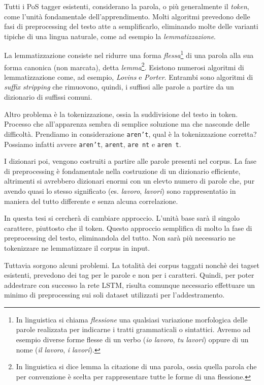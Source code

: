 Tutti i PoS tagger esistenti, considerano la parola, o pi\`u generalmente il \emph{token}, come l'unit\`a fondamentale dell'apprendimento.
Molti algoritmi prevedono delle fasi di preprocessing del testo atte a semplificarlo, eliminando molte delle varianti tipiche di una lingua naturale, come ad esempio la \emph{lemmatizzazione}.

La lemmatizzazione consiste nel ridurre una forma \emph{flessa}\footnote{In linguistica si chiama \emph{flessione} una qualsiasi variazione morfologica delle parole realizzata per indicarne i tratti grammaticali o sintattici. Avremo ad esempio diverse forme flesse di un verbo (\emph{io lavoro}, \emph{tu lavori}) oppure di un nome (\emph{il lavoro}, \emph{i lavori}).} di una parola alla sua forma canonica (non marcata), detta \emph{lemma}\footnote{In linguistica si dice lemma la citazione di una parola, ossia quella parola che per convenzione è scelta per rappresentare tutte le forme di una flessione.}.
Esistono numerosi algoritmi di lemmatizzazione come, ad esempio, \emph{Lovins} e \emph{Porter}.
Entrambi sono algoritmi di \emph{suffix stripping} che rimuovono, quindi, i suffissi alle parole a partire da un dizionario di suffissi comuni.

Altro problema \`e la tokenizzazione, ossia la suddivisione del testo in token. Processo che all'apparenza sembra di semplice soluzione ma che nasconde delle difficolt\`a.
Prendiamo in considerazione \texttt{aren't}, qual \`e la tokenizzazione corretta? Possiamo infatti avvere \texttt{aren't}, \texttt{arent}, \texttt{are nt} e \texttt{aren t}.

I dizionari poi, vengono costruiti a partire alle parole presenti nel corpus.
La fase di preprocessing \`e fondamentale nella costruzione di un dizionario efficiente, altrimenti si avrebbero dizionari enormi con un elevto numero di parole che, pur avendo quasi lo stesso significato (es. \emph{lavoro}, \emph{lavori}) sono rappresentatio in maniera del tutto differente e senza alcuna correlazione.

In questa tesi si cercher\`a di cambiare approccio. L'unit\`a base sar\`a il singolo carattere, piuttosto che il token.
Questo approccio semplifica di molto la fase di preprocessing del testo, eliminandola del tutto.
Non sar\`a pi\`u necessario ne tokenizzare ne lemmatizzare il corpus in input.

Tuttavia sorgono alcuni problemi. La totalit\`a dei corpus taggati nonch\`e dei tagset esistenti, prevedono dei tag per le parole e non per i caratteri.
Quindi, per poter addestrare con successo la rete LSTM, risulta comunque necessario effettuare un minimo di preprocessing sui soli dataset utilizzati per l'addestramento.

